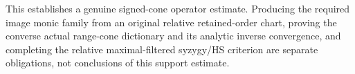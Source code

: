 This establishes a genuine signed-cone operator estimate. Producing the
required image monic family from an original relative retained-order chart,
proving the converse actual range-cone dictionary and its analytic inverse
convergence, and completing the relative maximal-filtered syzygy/HS criterion
are separate obligations, not conclusions of this support estimate.
